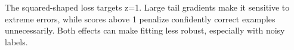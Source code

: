 The squared-shaped loss targets z=1. Large tail gradients make it sensitive to extreme errors, while scores above 1 penalize confidently correct examples unnecessarily. Both effects can make fitting less robust, especially with noisy labels.
